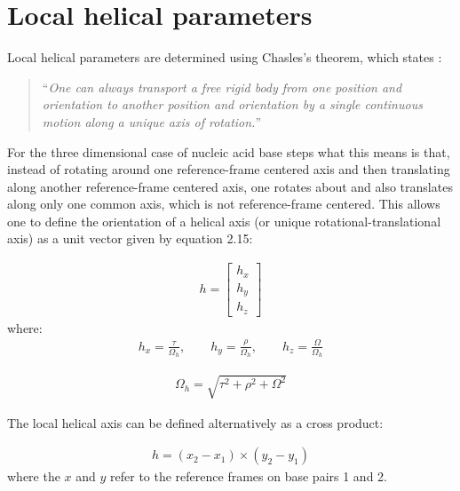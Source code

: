 \section{Local helical parameters}

Local helical parameters are determined using Chasles's theorem, which
states \cite{babcock1994}:
\begin{quote}
``\textit{One can  always transport  a free rigid  body from one  position and
  orientation  to  another  position   and  orientation  by  a  single
  continuous motion along a unique axis of rotation.}''
\end{quote}

\noindent For  the three dimensional  case of nucleic acid  base steps
what   this  means   is   that,  instead   of   rotating  around   one
reference-frame  centered  axis  and  then translating  along  another
reference-frame centered  axis, one rotates about  and also translates
along   only   one  common   axis,   which   is  not   reference-frame
centered. This allows one to  define the orientation of a helical axis
(or unique  rotational-translational axis) as  a unit vector  given by
equation 2.15:

\begin{gather}
h=\left[ \begin{array}{c}
h_x\\
h_y\\
h_z
\end{array} \right]
\end{gather}
where:
\begin{gather}
h_x = \frac{\tau}{\Omega_h}, \qquad h_y = \frac{\rho}{\Omega_h},
\qquad h_z = \frac{\Omega}{\Omega_h}
\end{gather}

\begin{gather}
\Omega_h = \sqrt{\tau^2 + \rho^2 + \Omega^2}
\end{gather}

The local helical axis can be defined alternatively \cite{bansal1995}
as a cross product:

\begin{gather}
h = (x_2 - x_1) \times (y_2 - y_1)
\end{gather}
where the  $x$ and $y$ refer to  the reference frames on  base pairs 1
and 2.





